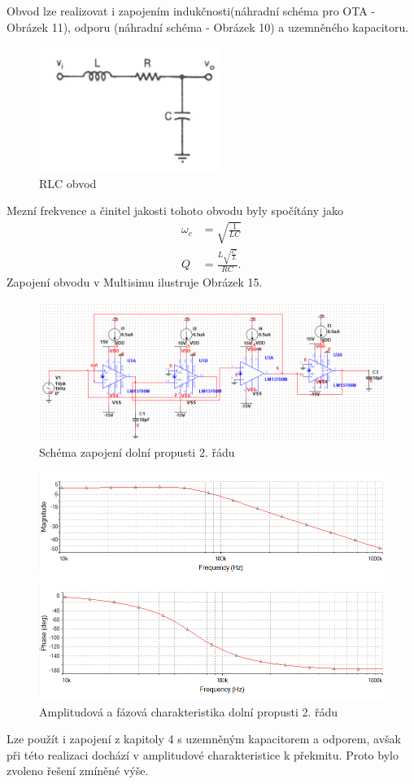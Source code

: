 \documentclass[twoside]{article}
\begin{document}
\noindent Obvod lze realizovat i zapojením indukčnosti(náhradní schéma pro OTA - Obrázek 11), odporu (náhradní schéma - Obrázek 10) a uzemněného kapacitoru. 
\begin{figure}[H]
\centering
\includegraphics[scale=0.8]{171.png}
\caption{RLC obvod \cite{9}}
\end{figure}
\noindent Mezní frekvence a činitel jakosti tohoto obvodu byly spočítány jako 
\begin{align}
\omega _c &= \sqrt{\frac{1}{LC}}\\
Q &= \frac{L\sqrt{\frac{C}{L}}}{RC}.
\end{align}
Zapojení obvodu v Multisimu ilustruje Obrázek 15.
\begin{figure}[H]
\centering
\includegraphics[scale=0.7]{1707.png}
\caption{Schéma zapojení dolní propusti 2. řádu}
\end{figure}
\begin{figure}[H]
\centering
\includegraphics[scale=0.75]{17072.png}
\caption{Amplitudová a fázová charakteristika dolní propusti 2. řádu}
\end{figure}
\noindent Lze použít i zapojení z kapitoly 4 s uzemněným kapacitorem a odporem, avšak při této realizaci dochází v amplitudové charakteristice k překmitu. Proto bylo zvoleno řešení zmíněné výše.
\end{document}
